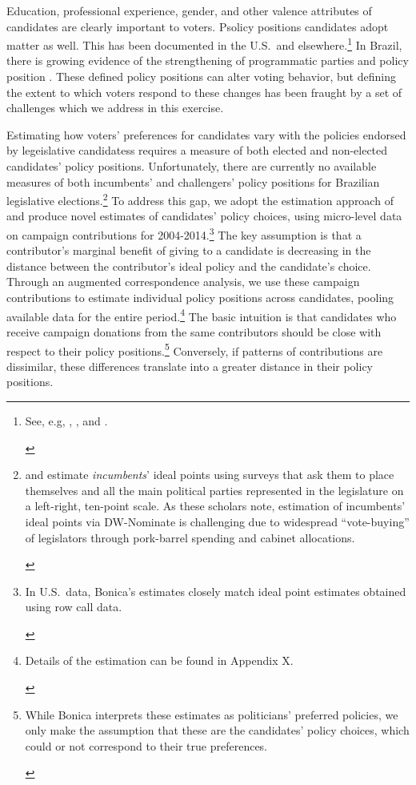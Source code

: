 \documentclass[12pt,english]{article}
\newcommand{\note}[1]{\footnote{ \begin{doublespace}#1  \end{doublespace}}}
\numberwithin{equation}{section}
\theoremstyle{plain}
\theoremstyle{remark}
\theoremstyle{plain}
\begin{document}
Education, professional experience, gender, and other valence attributes of candidates are clearly important to voters. Psolicy positions candidates adopt matter as well. This has been documented in the U.S.\ and elsewhere.\note{\normalsize See, e.g, , \citeasnoun{AnsolabehereJones2010}, and \citeasnoun{Iaryczoweretal2018}.} In Brazil, there is growing evidence of the strengthening of programmatic parties and policy position . These defined policy positions can alter voting behavior, but defining the extent to which voters respond to these changes has been fraught by a set of challenges which we address in this exercise.

Estimating how voters' preferences for candidates vary with the policies endorsed by legeislative candidatess requires a measure of both elected and non-elected candidates' policy positions. Unfortunately, there are currently no available measures of both incumbents' and challengers' policy positions for Brazilian legislative elections.\note{\normalsize {} and \citeasnoun{ZuccoLauderdale2011} estimate \emph{incumbents}' ideal points using surveys that ask them to place themselves and all the main political parties represented in the legislature on a left-right, ten-point scale. As these scholars note, estimation of incumbents' ideal points via DW-Nominate is challenging due to widespread ``vote-buying'' of legislators through pork-barrel spending and cabinet allocations.} %
To address this gap, we adopt the estimation approach of  and produce novel estimates of candidates' policy choices, using micro-level data on campaign contributions for 2004-2014.\note{\normalsize In U.S.\ data, Bonica's estimates closely match ideal point estimates obtained using row call data.} The key assumption is that a contributor's marginal benefit of giving to a candidate is decreasing in the distance between the contributor's ideal policy and the candidate's choice. Through an augmented correspondence analysis, we use these campaign contributions to estimate individual policy positions across candidates, pooling available data for the entire period.\note{Details of the estimation can be found in Appendix X.} The basic intuition is that candidates who receive campaign donations from the same contributors should be close with respect to their policy positions.\note{\normalsize While Bonica interprets these estimates as politicians' preferred policies, we  only make the assumption that these are the candidates' policy choices, which could or not correspond to their true preferences.} Conversely, if patterns of contributions are dissimilar, these differences translate into a greater distance in their policy positions.
    
\end{document}
